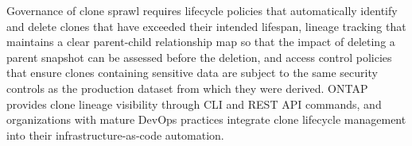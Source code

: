 \begin{securitybox}
Governance of clone sprawl requires lifecycle policies that automatically identify and delete clones that have exceeded their intended lifespan, lineage tracking that maintains a clear parent-child relationship map so that the impact of deleting a parent snapshot can be assessed before the deletion, and access control policies that ensure clones containing sensitive data are subject to the same security controls as the production dataset from which they were derived. ONTAP provides clone lineage visibility through CLI and REST API commands, and organizations with mature DevOps practices integrate clone lifecycle management into their infrastructure-as-code automation.

\end{securitybox}
